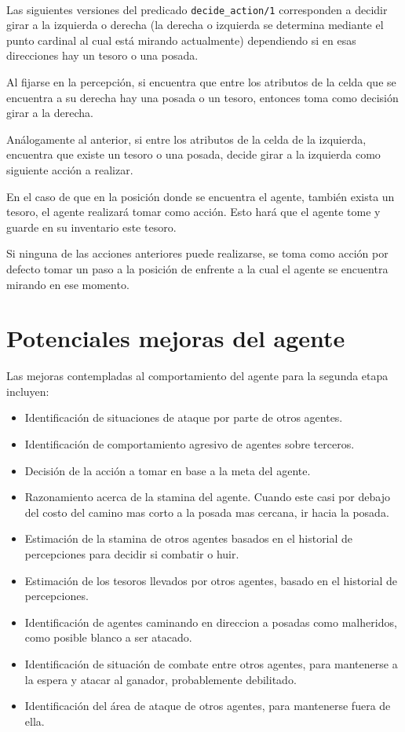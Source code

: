 \documentclass[a4paper,12pt]{report}
\begin{document}


\ 

Las siguientes versiones del predicado \texttt{decide\_action/1} corresponden a decidir girar a la 
izquierda o derecha (la derecha o izquierda se determina mediante el punto cardinal al cual est\'{a}
mirando actualmente) dependiendo si en esas direcciones hay un tesoro o una posada.

Al fijarse en la percepci\'{o}n, si encuentra que entre los atributos de la celda que se encuentra 
a su derecha hay una posada o un tesoro, entonces toma como decisi\'{o}n girar a la derecha.

An\'{a}logamente al anterior, si entre los atributos de la celda de la izquierda, encuentra que 
existe un tesoro o una posada, decide girar a la izquierda como siguiente acci\'{o}n a realizar.

En el caso de que en la posici\'{o}n donde se encuentra el agente, tambi\'{e}n exista un tesoro, el 
agente realizar\'{a} tomar como acci\'{o}n. 
Esto har\'{a} que el agente tome y guarde en su inventario este tesoro.

Si ninguna de las acciones anteriores puede realizarse, se toma como acci\'{o}n por defecto 
tomar un paso a la posici\'{o}n de enfrente a la cual el agente se encuentra mirando en ese 
momento.

\section{Potenciales mejoras del agente}

Las mejoras contempladas al comportamiento del agente para la segunda etapa incluyen:
\begin{itemize}
\item Identificaci\'{o}n de situaciones de ataque por parte de otros agentes.
\item Identificaci\'{o}n de comportamiento agresivo de agentes sobre terceros.
\item Decisi\'{o}n de la acci\'{o}n a tomar en base a la meta del agente.
\item Razonamiento acerca de la stamina del agente. Cuando este casi por debajo del costo del camino mas
      corto a la posada mas cercana, ir hacia la posada.
\item Estimaci\'{o}n de la stamina de otros agentes basados en el historial de percepciones para 
      decidir si combatir o huir.
\item Estimaci\'{o}n de los tesoros llevados por otros agentes, basado en el historial de percepciones.
\item Identificaci\'{o}n de agentes caminando en direccion a posadas como malheridos, como posible 
      blanco a ser atacado. 
\item Identificaci\'{o}n de situaci\'{o}n de combate entre otros agentes, para mantenerse a la espera
      y atacar al ganador, probablemente debilitado.
\item Identificaci\'{o}n del \'{a}rea de ataque de otros agentes, para mantenerse fuera de ella. 
\end{itemize}
\end{document}
